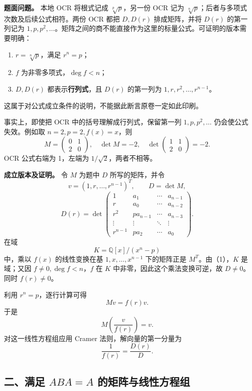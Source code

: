 \documentclass[11pt,fontset=fandol]{ctexart}
\providecommand{\tightlist}{\setlength{\itemsep}{0pt}\setlength{\parskip}{0pt}}
\begin{document}
\textbf{题面问题。} 本地 OCR 将根式记成 \(\sqrt[p]{p}\)，另一份 OCR 记为
\(\sqrt[n]{p}\)；后者与多项式次数及后续公式相符。两份 OCR 都把
\(D,D(r)\) 排成矩阵，并将 \(D(r)\) 的第一列记为
\(1,p,p^2,\ldots\)。矩阵之间的商不能直接作为这里的标量公式。可证明的版本需要明确：

\begin{enumerate}
\def\labelenumi{\arabic{enumi}.}
\tightlist
\item
  \(r=\sqrt[n]{p}\)，满足 \(r^n=p\)；
\item
  \(f\) 为非零多项式，\(\deg f<n\)；
\item
  \(D,D(r)\) 都表示\textbf{行列式}，且 \(D(r)\) 的第一列为
  \(1,r,r^2,\ldots,r^{n-1}\)。
\end{enumerate}

这属于对公式成立条件的说明，不能据此断言原卷一定如此印刷。

事实上，即使把 OCR 中的括号理解成行列式，保留第一列 \(1,p,p^2,\ldots\)
仍会使公式失效。例如取 \(n=2,p=2,f(x)=x\)，则 \[
M=\begin{pmatrix}0&1\\2&0\end{pmatrix},\quad
\det M=-2,\quad
\det\begin{pmatrix}1&1\\2&0\end{pmatrix}=-2.
\] OCR 公式右端为 1，左端为 \(1/\sqrt2\)，两者不相等。

\textbf{成立版本及证明。} 令 \(M\) 为题中 \(D\) 所写的矩阵，并令 \[
v=(1,r,\ldots,r^{n-1})^T,\qquad
D=\det M,
\] \[
D(r)=\det\begin{pmatrix}
1&a_1&\cdots&a_{n-1}\\
r&a_0&\cdots&a_{n-2}\\
r^2&pa_{n-1}&\cdots&a_{n-3}\\
\vdots&\vdots&\ddots&\vdots\\
r^{n-1}&pa_2&\cdots&a_0
\end{pmatrix}.
\] 在域 \[
K=\mathbb Q[x]/(x^n-p)
\] 中，乘以 \(f(x)\) 的线性变换在基 \(1,x,\ldots,x^{n-1}\) 下的矩阵正是
\(M^T\)。由（1），\(K\) 是域；又因 \(f\neq0,\deg f<n\)，\(f\) 在 \(K\)
中非零，因此这个乘法变换可逆，故 \(D\neq0\)。同时 \(f(r)\neq0\)。

利用 \(r^n=p\)，逐行计算可得 \[
Mv=f(r)v.
\] 于是 \[
M\left(\frac{v}{f(r)}\right)=v.
\] 对这一线性方程组应用 Cramer 法则，解向量的第一分量为 \[
\boxed{\frac1{f(r)}=\frac{D(r)}D.}
\]

\subsection{\texorpdfstring{二、满足 \(ABA=A\)
的矩阵与线性方程组}{二、满足 ABA=A 的矩阵与线性方程组}}\label{ux4e8cux6ee1ux8db3-abaa-ux7684ux77e9ux9635ux4e0eux7ebfux6027ux65b9ux7a0bux7ec4}
\end{document}
